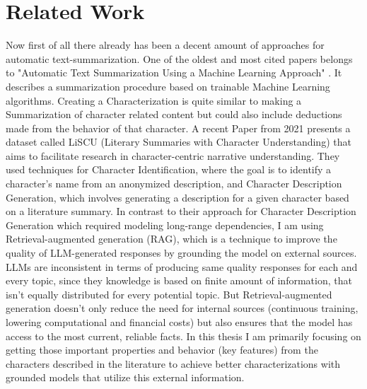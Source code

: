 \chapter{Related Work}
Now first of all there already has been a decent amount of approaches for automatic text-summarization.
One of the oldest and most cited papers belongs to "Automatic Text Summarization Using a Machine Learning Approach" \cite{10.1007/3-540-36127-8_20}. It describes a summarization procedure based on trainable Machine Learning algorithms. Creating a Characterization is quite similar to making a Summarization of character related content but could also include deductions made from the behavior of that character. 
A recent Paper from 2021 \cite{brahman-etal-2021-characters-tell} presents a dataset called LiSCU (Literary Summaries with Character Understanding) that aims to facilitate research in character-centric narrative understanding. They used techniques for Character Identification, where the goal is to identify a character's name from an anonymized description, and Character Description Generation, which involves generating a description for a given character based on a literature summary. In contrast to their approach for Character Description Generation which required modeling long-range dependencies, I am using
Retrieval-augmented generation (RAG), which is a technique to improve the quality of LLM-generated responses by grounding the model on external sources. LLMs are inconsistent in terms of producing same quality responses for each and every topic, since they knowledge is based on finite amount of information, that isn't equally distributed for every potential topic. But Retrieval-augmented generation doesn't only reduce the need for internal sources (continuous training, lowering computational and financial costs) but also ensures that the model has access to the most current, reliable facts.
In this thesis I am primarily focusing on getting those important properties and behavior (key features) from the characters described in the literature to achieve better characterizations with grounded models that utilize this external information.
